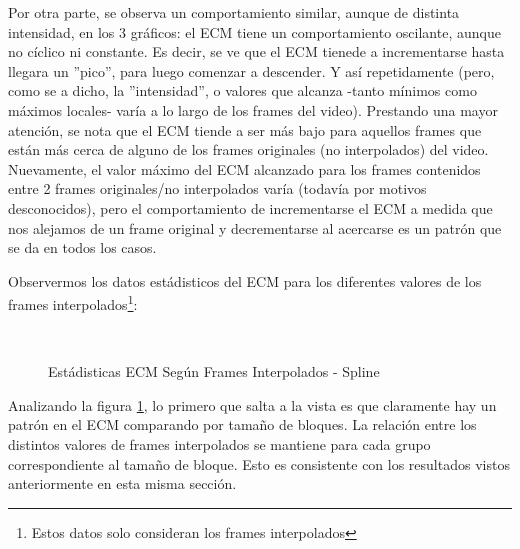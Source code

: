 \par Por otra parte, se observa un comportamiento similar, aunque de distinta
intensidad, en los 3 gr\'aficos: el ECM tiene un comportamiento oscilante,
aunque no c\'iclico ni constante. Es decir, se ve que el ECM tienede a
incrementarse hasta llegara un ''pico'', para luego comenzar a descender. Y
as\'i repetidamente (pero, como se a dicho, la ''intensidad'', o valores que
alcanza -tanto m\'inimos como m\'aximos locales- var\'ia a lo largo de los
frames del video). Prestando una mayor atenci\'on, se nota que el ECM tiende a
ser m\'as bajo para aquellos frames que est\'an m\'as cerca de alguno de los
frames originales (no interpolados) del video. Nuevamente, el valor m\'aximo
del ECM alcanzado para los frames contenidos entre 2 frames originales/no
interpolados var\'ia (todav\'ia por motivos desconocidos), pero el
comportamiento de incrementarse el ECM a medida que nos alejamos de un frame
original y decrementarse al acercarse es un patr\'on que se da en todos los
casos.

\par Observermos los datos est\'adisticos del ECM para los diferentes valores
de los frames interpolados\footnote{Estos datos solo consideran los frames
interpolados}:

\begin{figure}[H]
    \centering
    \\
    \caption{Est\'adisticas ECM Seg\'un Frames Interpolados - Spline}
    \label{fig:fija-fija_spline-mse_estadisticas}
\end{figure}

\par Analizando la figura \ref{fig:fija-fija_spline-mse_estadisticas}, lo primero
que salta a la vista es que claramente hay un patr\'on en el ECM comparando por
tama\~no de bloques. La relaci\'on entre los distintos valores de frames
interpolados se mantiene para cada grupo correspondiente al tama\~no de bloque.
Esto es consistente con los resultados vistos anteriormente en esta misma
secci\'on.

